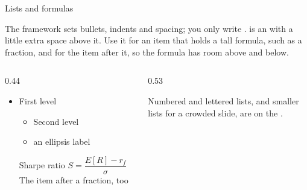 
\begin{standardframe}{Lists and formulas}
	{\small The framework sets bullets, indents and spacing; you only write
	.  is an  with a little extra space
	above it. Use it for an item that holds a tall formula, such as a fraction,
	and for the item after it, so the formula has room above and below.\par}
	\begin{columns}[T,onlytextwidth]
		\begin{column}{0.44\linewidth}
			\begin{itemize}
				\item First level
				\begin{itemize}
					\item Second level
					\item[\SMBulletEllipsis] an ellipsis label
				\end{itemize}
				\tallitem Sharpe ratio $S=\dfrac{E[R]-r_f}{\sigma}$
				\tallitem The item after a fraction, too
			\end{itemize}
		\end{column}
		\begin{column}{0.53\linewidth}
			\medskip
			{\footnotesize Numbered and lettered lists, and smaller lists for a crowded slide, are on the .\par}
		\end{column}
	\end{columns}
\end{standardframe}
